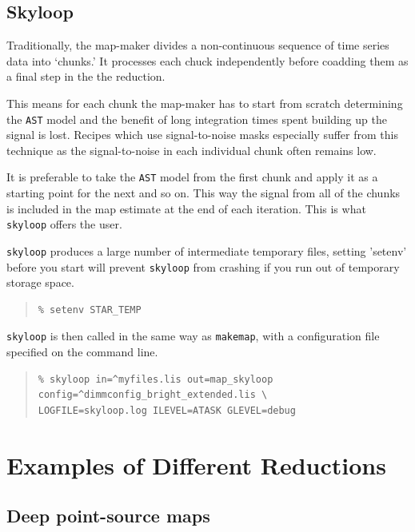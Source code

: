 \documentclass[twoside,11pt]{article}
\newcommand{\xlabel}[1]{}
\renewcommand{\_}{\texttt{\symbol{95}}}
\newenvironment{myquote}{\begin{quote}\begin{small}}{\end{small}\end{quote}}
\begin{document}
\subsection{\xlabel{skyloop}Skyloop}
\label{sec:skyloop}

Traditionally, the map-maker divides a non-continuous sequence of time
series data into `chunks.' It processes each chuck independently
before coadding them as a final step in the the reduction.

This means for each chunk the map-maker has to start from scratch
determining the \texttt{AST} model and the benefit of long integration
times spent building up the signal is lost. Recipes which use
signal-to-noise masks especially suffer from this technique as the
signal-to-noise in each individual chunk often remains low.

It is preferable to take the \texttt{AST} model from the first chunk
and apply it as a starting point for the next and so on. This way the
signal from all of the chunks is included in the map estimate at the
end of each iteration. This is what \texttt{skyloop} offers the user.

\texttt{skyloop} produces a large number of intermediate temporary
files, setting 'setenv' before you start will prevent \texttt{skyloop}
from crashing if you run out of temporary storage space.
\begin{myquote}
\begin{verbatim}
% setenv STAR_TEMP
\end{verbatim}
\end{myquote}
 \texttt{skyloop} is then called in the same way as \texttt{makemap}, with
 a configuration file specified on the command line.
\begin{myquote}
\begin{verbatim}
% skyloop in=^myfiles.lis out=map_skyloop config=^dimmconfig_bright_extended.lis \
LOGFILE=skyloop.log ILEVEL=ATASK GLEVEL=debug
\end{verbatim}
\end{myquote}

\clearpage
\section{\xlabel{Examples}Examples of Different Reductions}
\label{sec:eg}

\subsection{\xlabel{Cosmology}Deep point-source maps}
\label{sec:cosmology}
\end{document}
